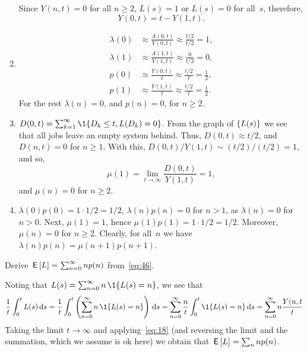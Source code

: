 \documentclass[stochastic-or.tex]{subfiles}
\begin{document}
\begin{exercise}
\begin{solution}
\begin{enumerate}
Since $Y(n,t)=0$ for all $n\geq 2$, $L(s) = 1$ or
 $L(s)=0$ for all~$s$, therefore,
 \begin{equation*}
 Y(0,t) = t-Y(1,t).
 \end{equation*}
 \item
 \begin{align*}
 \lambda(0) &\approx \frac{A(0,t)}{Y(0,t)} \approx \frac{t/2}{t/2} = 1, \\
 \lambda(1) &\approx \frac{A(1,t)}{Y(1,t)} \approx \frac{0}{t/2} = 0, \\
 p(0) &\approx \frac{Y(0,t)}{t} \approx \frac{t/2}{t} = \frac 1 2, \\
 p(1) &\approx \frac{Y(1,t)}{t} \approx \frac{t/2}{t} = \frac 1 2.
 \end{align*}
For the rest $\lambda(n) = 0$, and $p(n)=0$, for $n\geq 2$.
\item
 $D(0,t) = \sum_{k=1}^\infty\1{D_k\leq t, L(D_k)=0}$. From the graph of $\{L(s)\}$ we see that all jobs leave an empty system behind. Thus, $D(0,t) \approx t/2$, and $D(n,t)=0$ for $n\geq 1$. With this, $D(0,t)/Y(1,t) \sim (t/2)/(t/2) = 1$, and so,
 \begin{equation*}
 \mu(1) = \lim_{t\to\infty} \frac{D(0,t)}{Y(1, t)} = 1,
 \end{equation*}
and $\mu(n) = 0$ for $n\geq2$.
\item
 $\lambda(0)p(0)=1\cdot 1/2 = 1/2$, $\lambda(n)p(n)= 0$ for $n>1$, as $\lambda(n)=0$ for $n>0$.
Next, $\mu(1)=1$, hence $\mu(1) p(1) = 1\cdot 1/2 = 1/2$. Moreover, $\mu(n)=0$ for $n\geq 2$.
Clearly, for all~$n$ we have $\lambda(n)p(n)= \mu(n+1)p(n+1)$.
\end{enumerate}
\end{solution}
\end{exercise}

\begin{exercise}\label{ex:l-111}
 Derive $\,\mathsf{E}\left[L\right] = \sum_{n=0}^\infty n p(n)$ from~\cref{eq:46}.
\begin{solution}
Noting that %
$L(s) = \sum_{n=0}^\infty n\, \1{\L(s) = n}$, we see that
\begin{equation*}
\frac 1 t \int_0^t L(s) \d s = \frac 1 t \int_0^t \left(\sum_{n=0}^{\infty} n\, \1{\L(s) = n}\right) \d s
= \sum_{n=0}^{\infty} \frac n t \int_0^t \1{\L(s) = n} \d s = \sum_{n=0}^{\infty} n \frac{Y(n,t}{t}
\end{equation*}
Taking the limit $t\to\infty$ and applying~\cref{eq:18} (and reversing the limit and the summation, which we assume is ok here) we obtain that $\,\mathsf{E}\left[L\right] = \sum_{n} n p(n)$.
\end{solution}
\end{exercise}
\end{document}
